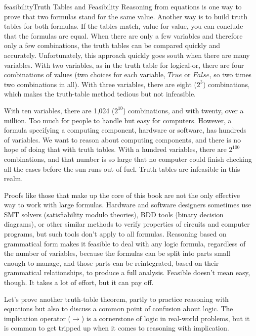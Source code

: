 \begin{aside}{feasibility}{Truth Tables and Feasibility}
Reasoning from equations is one way to prove that two formulas stand
for the same value.
Another way is to build truth tables for both formulas.
If the tables match, value for value, you can conclude that
the formulas are equal.
When there are only a few variables and therefore only a few combinations,
the truth tables can be compared quickly and accurately.
Unfortunately, this approach quickly goes south when there are many variables.
With two variables, as in the truth table
for logical-or, there are four combinations of values
(two choices for each variable, $True$ or $False$, so two times two
combinations in all). With three variables, there are eight
($2^3$) combinations, which makes the truth-table method tedious
but not infeasible.

With ten variables, there are 1,024 ($2^{10}$) combinations,
and with twenty, over a million.
Too much for people to handle but easy for computers.
However, a formula specifying a computing component,
hardware or software, has hundreds of variables.
We want to reason about computing components,
and there is no hope of doing that with truth tables.
With a hundred variables, there are $2^{100}$ combinations,
and that number is so large that no computer could
finish checking all the cases before the sun runs out of fuel.
Truth tables are infeasible in this realm.

Proofs like those that make up the core of this book
are not the only effective way to work with large formulas.
Hardware and software designers sometimes use
SMT solvers (satisfiability modulo theories),
BDD tools (binary decision diagrams), or other similar methods
to verify properties of circuits and computer programs,
but such tools don't apply to all formulas.
Reasoning based on grammatical form
makes it feasible to deal with any logic formula,
regardless of the number of variables,
because the formulas can be split into parts small enough
to manage, and those parts can be reintegrated, based on
their grammatical relationships, to produce a full analysis.
Feasible doesn't mean easy, though.
It takes a lot of effort, but it can pay off.
\end{aside}

Let's prove another truth-table theorem, partly to practice
reasoning with equations but also to discuss a common
point of confusion about logic. The implication operator
($\rightarrow$) is a cornerstone of logic in real-world problems,
but it is common to get tripped up when it comes to
reasoning with implication.

